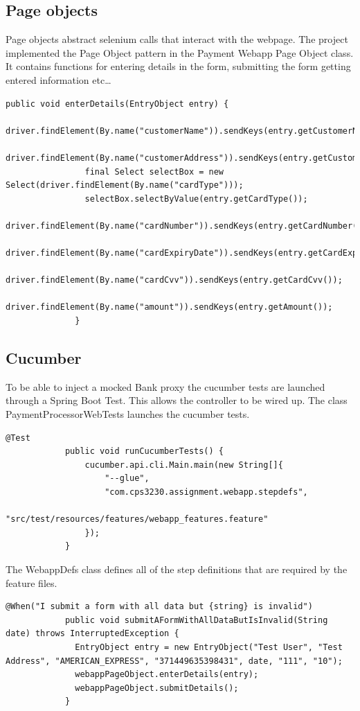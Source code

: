 \documentclass[11pt, a4paper]{article}
\begin{document}
    \subsection{Page objects}
        Page objects abstract selenium calls that interact with the webpage. The project implemented the Page Object pattern in the Payment Webapp Page Object class. It contains functions for entering details in the form, submitting the form getting entered information etc\dots
        \begin{lstlisting}[caption=A method in the Payment Webapp Page Object that facilitates form entry]
            public void enterDetails(EntryObject entry) {
                driver.findElement(By.name("customerName")).sendKeys(entry.getCustomerName());
                driver.findElement(By.name("customerAddress")).sendKeys(entry.getCustomerAddress());
                final Select selectBox = new Select(driver.findElement(By.name("cardType")));
                selectBox.selectByValue(entry.getCardType());
                driver.findElement(By.name("cardNumber")).sendKeys(entry.getCardNumber());
                driver.findElement(By.name("cardExpiryDate")).sendKeys(entry.getCardExpiryDate());
                driver.findElement(By.name("cardCvv")).sendKeys(entry.getCardCvv());
                driver.findElement(By.name("amount")).sendKeys(entry.getAmount());
              }
        \end{lstlisting}
    \subsection{Cucumber}
        To be able to inject a mocked Bank proxy the cucumber tests are launched through a Spring Boot Test. This allows the controller to be wired up. The class PaymentProcessorWebTests launches the cucumber tests.
        \begin{lstlisting}[caption=The unit test that launches the cucumber tests]
            @Test
            public void runCucumberTests() {
                cucumber.api.cli.Main.main(new String[]{
                    "--glue",
                    "com.cps3230.assignment.webapp.stepdefs",
                    "src/test/resources/features/webapp_features.feature"
                });
            }
        \end{lstlisting}
        The WebappDefs class defines all of the step definitions that are required by the feature files.
        \begin{lstlisting}[caption=A step definition using a cucumber expressions]
            @When("I submit a form with all data but {string} is invalid")
            public void submitAFormWithAllDataButIsInvalid(String date) throws InterruptedException {
              EntryObject entry = new EntryObject("Test User", "Test Address", "AMERICAN_EXPRESS", "371449635398431", date, "111", "10");
              webappPageObject.enterDetails(entry);
              webappPageObject.submitDetails();
            }
        \end{lstlisting}
%  
% 
\end{document}
